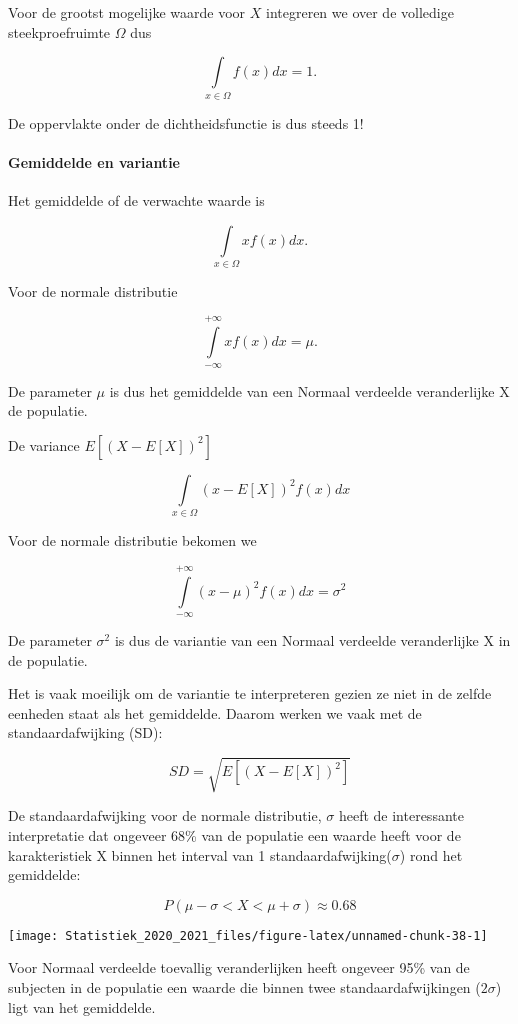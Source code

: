 \documentclass[
  12pt,dutch,coursenotes]{book}
\theoremstyle{definition}
\theoremstyle{definition}
\theoremstyle{definition}
\theoremstyle{remark}
\begin{document}
Voor de grootst mogelijke waarde voor \(X\) integreren we over de volledige steekproefruimte \(\Omega\) dus

\[\int \limits_{x \in \Omega} f(x) dx=1.\]

De oppervlakte onder de dichtheidsfunctie is dus steeds 1!

\hypertarget{gemiddelde-en-variantie}{%
\paragraph{Gemiddelde en variantie}\label{gemiddelde-en-variantie}}

Het gemiddelde of de verwachte waarde is

\[\int \limits_{x \in \Omega} x f(x) dx.\]

Voor de normale distributie

\[\int \limits_{-\infty}^{+\infty} x f(x) dx = \mu.\]

De parameter \(\mu\) is dus het gemiddelde van een Normaal verdeelde veranderlijke X de populatie.

De variance \(E[(X-E[X])^2]\)

\[\int \limits_{x \in \Omega} (x-E[X])^2 f(x) dx\]

Voor de normale distributie bekomen we

\[\int \limits_{-\infty}^{+\infty} (x-\mu)^2 f(x) dx = \sigma^2\]

De parameter \(\sigma^2\) is dus de variantie van een Normaal verdeelde veranderlijke X in de populatie.

Het is vaak moeilijk om de variantie te interpreteren gezien ze niet in de zelfde eenheden staat als het gemiddelde. Daarom werken we vaak met de standaardafwijking (SD):

\[SD=\sqrt{E[(X-E[X])^2]}\]

De standaardafwijking voor de normale distributie, \(\sigma\) heeft de interessante interpretatie dat ongeveer 68\% van de populatie een waarde heeft voor de karakteristiek X binnen het interval van 1 standaardafwijking(\(\sigma\)) rond het gemiddelde:

\[P(\mu-\sigma < X < \mu + \sigma) \approx 0.68\]

\begin{center}\texttt{[image: Statistiek\_2020\_2021\_files/figure-latex/unnamed-chunk-38-1]} \end{center}

Voor Normaal verdeelde toevallig veranderlijken heeft ongeveer 95\% van de subjecten in de populatie een waarde die binnen twee standaardafwijkingen (\(2 \sigma\)) ligt van het gemiddelde.
\end{document}

